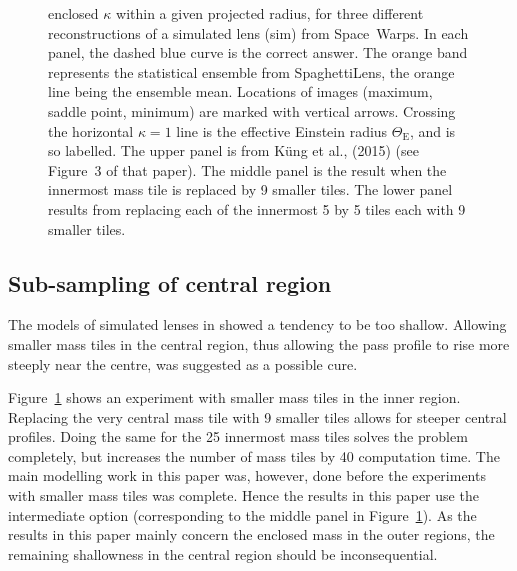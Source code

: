 \documentclass[fleqn,usenatbib]{mnras}
\newcommand{\figref}[1]{\ref{fig:#1}}
\newcommand{\ER}{$\Theta_{\text{E}}$} %
\begin{document}
\begin{figure}
{    enclosed $\kappa$ within a given projected radius, for three
    different reconstructions of a simulated lens (sim) from
    Space~Warps.  In each panel, the dashed blue curve is the correct
    answer.  The orange band represents the statistical ensemble from
    SpaghettiLens, the orange line being the ensemble mean.  Locations of
    images (maximum, saddle point, minimum) are marked with vertical
    arrows.  Crossing the horizontal $\kappa=1$ line is the effective
    Einstein radius \ER, and is so labelled. The upper panel is from
    K\"ung et al., (2015) (see Figure~3 of that paper).  The middle
    panel is the result when the innermost mass tile is replaced by 9
    smaller tiles.  The lower panel results from replacing each of the
    innermost 5 by 5 tiles each with 9 smaller tiles.}
  \label{fig:subsampling}
\end{figure}

\subsection{Sub-sampling of central region}\label{subsec:hires}

The models of simulated lenses in \cite{2015MNRAS.447.2170K} showed a
tendency to be too shallow.  Allowing smaller mass tiles in the
central region, thus allowing the pass profile to rise more steeply
near the centre, was suggested as a possible cure.

Figure~\figref{subsampling} shows an experiment with smaller mass
tiles in the inner region.  Replacing the very central mass tile with
9 smaller tiles allows for steeper central profiles.  Doing the same
for the 25 innermost mass tiles solves the problem completely, but increases
the number of mass tiles by 40%
computation time.  The main modelling work in this paper was, however,
done before the experiments with smaller mass tiles was complete.
Hence the results in this paper use the intermediate option
(corresponding to the middle panel in Figure~\figref{subsampling}).
As the results in this paper mainly concern the enclosed mass in the
outer regions, the remaining shallowness in the central region should
be inconsequential.
\end{document}
